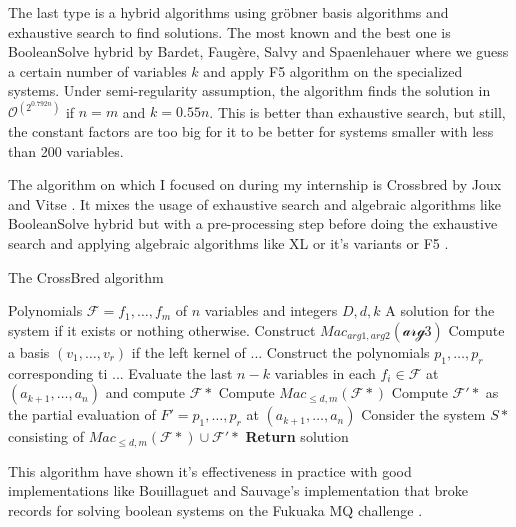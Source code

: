 \documentclass[english]{article}
\newcommand{\Mac}[3]{{Mac_{#1, #2}(\mathcal{#3})}}
\begin{document}
		The last type is a hybrid algorithms using gröbner basis algorithms and exhaustive search to find solutions. The most known and the best one is BooleanSolve hybrid by Bardet, Faugère, Salvy and Spaenlehauer \cite{BFSS13} where we guess a certain number of variables $k$ and apply F5 algorithm on the specialized systems. Under semi-regularity assumption, the algorithm finds the solution in $\mathcal{O}^(2^{0.792n})$ if $n = m$ and $k = 0.55n$. This is better than exhaustive search, but still, the constant factors are too big for it to be better for systems smaller with less than 200 variables.
		
		The algorithm on which I focused on during my internship is Crossbred by Joux and Vitse \cite{JV17}. It mixes the usage of exhaustive search and algebraic algorithms like BooleanSolve hybrid but with a pre-processing step before doing the exhaustive search and applying algebraic algorithms like XL \cite{CKPS00} or it's variants or F5 \cite{F02}.
		
		\begin{algorithm}
			\caption{The CrossBred algorithm}\label{alg:crossbred}
			\begin{algorithmic}[1]
				\Require Polynomials $\mathcal{F} = {f_1, \dots, f_m}$ of $n$ variables and integers $D,d,k$
				\Ensure  A solution for the system if it exists or nothing otherwise.
				\State Construct $\Mac{arg1}{arg2}{arg3}$
				\State Compute a basis $(v_1,\dots,v_r)$ if the left kernel of ...
				\State Construct the polynomials $p_1,\dots,p_r$ corresponding ti ...
				\State Evaluate the last $n-k$ variables in each $f_i \in \mathcal{F}$ at $(a_{k+1},\dots,a_n)$ and compute $\mathcal{F}*$
				\State Compute $Mac_{\leq d, m}(\mathcal{F}*)$
				\State Compute $\mathcal{F}'*$ as the partial evaluation of $F' = {p_1,\dots,p_r}$ at $(a_{k+1},\dots,a_n)$
				\State Consider the system $S*$ consisting of $Mac_{\leq d, m}(\mathcal{F}*) \cup \mathcal{F}'*$
				\State \textbf{Return} solution
				\EndIf
				\EndFor
			\end{algorithmic}
		\end{algorithm}
		
		This algorithm have shown it's effectiveness in practice with good implementations like Bouillaguet and Sauvage's implementation \cite {BS23} that broke records for solving boolean systems on the Fukuaka MQ challenge \cite{MQFUK}.
		
\end{document}
